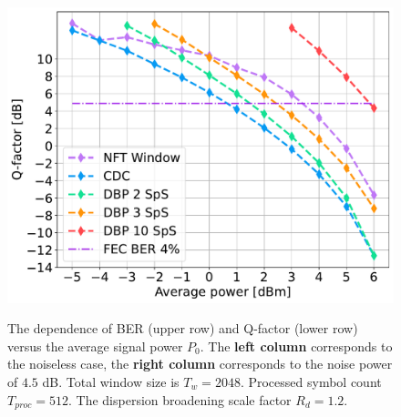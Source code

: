 \begin{figure}[tpb]
\begin{minipage}[h]{0.5\linewidth}
{        \includegraphics[width=1\linewidth]{images/window/q_nft_window_wo_noise.pdf}
    }
    \end{minipage}
    \hfill
    \begin{minipage}[h]{0.5\linewidth}
    \end{minipage}
    \caption{The dependence of BER (upper row) and Q-factor (lower row) versus the average signal power $P_0$. The \textbf{left column} corresponds to the noiseless case, the \textbf{right column} corresponds to the noise power of $4.5$ dB. Total window size is $T_w=2048$. Processed symbol count $T_{proc} = 512$. The dispersion broadening scale factor $R_d=1.2$.}
    \label{fig:noise_all}
\end{figure}

